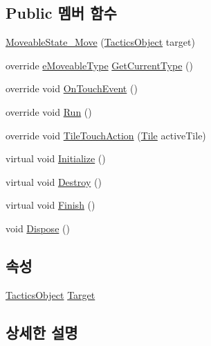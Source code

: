 \subsection*{Public 멤버 함수}
\begin{DoxyCompactItemize}
\item 
\hyperlink{class_moveable_object_1_1_moveable_state___move_a2f2322394bbc726faa9aa329ff198429}{Moveable\+State\+\_\+\+Move} (\hyperlink{class_tactics_object}{Tactics\+Object} target)
\item 
override \hyperlink{_moveable_object_8cs_a90215797ba850e199f3ef63d7c56f132}{e\+Moveable\+Type} \hyperlink{class_moveable_object_1_1_moveable_state___move_a9f439e191e05bc5e157fbeabde037fc6}{Get\+Current\+Type} ()
\item 
override void \hyperlink{class_moveable_object_1_1_moveable_state___move_a889290d4ac29ed29876312697a846a9f}{On\+Touch\+Event} ()
\item 
override void \hyperlink{class_moveable_object_1_1_moveable_state___move_aa738e589c4c0f1634599b50a6f681aa7}{Run} ()
\item 
override void \hyperlink{class_moveable_object_1_1_moveable_state___move_a38a7adcb49e881666e2f4a4728cc917d}{Tile\+Touch\+Action} (\hyperlink{class_tile}{Tile} active\+Tile)
\item 
virtual void \hyperlink{class_m_c_n_1_1_state_a5be59bc891e64cbbe4322d74a6746908}{Initialize} ()
\item 
virtual void \hyperlink{class_m_c_n_1_1_state_aebf48ef248bbf185d6aae91d9789459e}{Destroy} ()
\item 
virtual void \hyperlink{class_m_c_n_1_1_state_a2492ca731678b8216c02134dddeeb745}{Finish} ()
\item 
void \hyperlink{class_m_c_n_1_1_state_af6df0477e0dead784489688cb2c2093e}{Dispose} ()
\end{DoxyCompactItemize}
\subsection*{속성}
\begin{DoxyCompactItemize}
\item 
\hyperlink{class_tactics_object}{Tactics\+Object} \hyperlink{class_m_c_n_1_1_state_a79a563b32f183c9adc9a96679fc57eb8}{Target}
\end{DoxyCompactItemize}


\subsection{상세한 설명}


